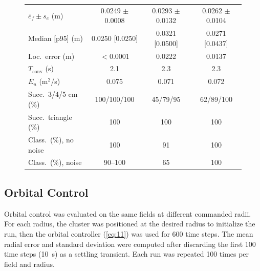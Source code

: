 \documentclass[lettersize,journal]{IEEEtran}
\makeatletter
\newcommand{\rev}[1]{#1}                             %
\providecommand{\DIFadd}[1]{{\protect\color{DIFaddtx}\uline{#1}}} %
\providecommand{\DIFdel}[1]{{\protect\color{DIFdeltx}\sout{#1}}} %
\providecommand{\DIFaddbegin}{\protect\color{DIFaddtx}} %
\providecommand{\DIFaddend}{\protect\color{black}} %
\providecommand{\DIFdelbegin}{\protect\color{DIFdeltx}} %
\providecommand{\DIFdelend}{\protect\color{black}} %
\providecommand{\DIFscaledelfig}{0.5} %
\newlength{\DIFdelgraphicswidth} %
\newlength{\DIFdelgraphicsheight} %
\providecommand{\DIFaddincludegraphics}[2][]{{\color{DIFaddtx}\setlength{\fboxrule}{1.5pt}\fbox{\DIFOincludegraphics[#1]{#2}}}} %
\providecommand{\DIFdelincludegraphics}[2][]{%
\sbox{\DIFdelgraphicsbox}{\DIFOincludegraphics[#1]{#2}}%
\settoboxwidth{\DIFdelgraphicswidth}{\DIFdelgraphicsbox} %
\settoboxtotalheight{\DIFdelgraphicsheight}{\DIFdelgraphicsbox} %
\scalebox{\DIFscaledelfig}{%
\parbox[b]{\DIFdelgraphicswidth}{\usebox{\DIFdelgraphicsbox}\\[-\baselineskip] \rule{\DIFdelgraphicswidth}{0em}}\llap{\resizebox{\DIFdelgraphicswidth}{\DIFdelgraphicsheight}{%
\setlength{\unitlength}{\DIFdelgraphicswidth}%
\begin{picture}(1,1)%
\thicklines\linethickness{2pt} %
{\color{DIFdeltx}\put(0,0){\framebox(1,1){}}}%
{\color{DIFdeltx}\put(0,0){\line( 1,1){1}}}%
{\color{DIFdeltx}\put(0,1){\line(1,-1){1}}}%
\end{picture}%
}\hspace*{3pt}}} %
} %
\DeclareRobustCommand{\DIFaddbegin}{\DIFOaddbegin \let\includegraphics\DIFaddincludegraphics} %
\DeclareRobustCommand{\DIFaddend}{\DIFOaddend \let\includegraphics\DIFOincludegraphics} %
\DeclareRobustCommand{\DIFdelbegin}{\DIFOdelbegin \let\includegraphics\DIFdelincludegraphics} %
\DeclareRobustCommand{\DIFdelend}{\DIFOdelend \let\includegraphics\DIFOincludegraphics} %
\let\sout@orig\sout %
\renewcommand{\sout}[1]{\ifmmode\text{\sout@orig{\ensuremath{#1}}}\else\sout@orig{#1}\fi} %
\makeatother
\begin{document}
\begin{figure}[!t]
{{\begin{tabular}{lccc}
$\bar{e}_f \pm s_e$ (m) & 0.0249 $\pm$ 0.0008 & 0.0293 $\pm$ 0.0132 & 0.0262 $\pm$ 0.0104 \\
Median [p95] (m) & 0.0250 [0.0250] & 0.0321 [0.0500] & 0.0271 [0.0437] \\
Loc.\ error (m) & $<$0.0001 & 0.0222 & 0.0137 \\
$T_{\mathrm{conv}}$ (s) & 2.1 & 2.3 & 2.3 \\
$E_u$ (m$^2$/s) & 0.075 & 0.071 & 0.072 \\
Succ.\ 3/4/5 cm (\%) & 100/100/100 & 45/79/95 & 62/89/100 \\
Succ.\ triangle (\%) & 100 & 100 & 100 \\
Class.\ (\%), no noise & 100 & 91 & 100 \\
Class.\ (\%), noise & 90--100 & 65 & 100 \\
\hline
\end{tabular}} %
}%
\DIFdelend %
    \DIFaddbegin \label{fig:nonlinear}
\end{figure}
\DIFaddend 

\subsection{Orbital Control}

Orbital control was evaluated on the same \DIFdelbegin \DIFdel{eight }\DIFdelend \DIFaddbegin \DIFadd{ten }\DIFaddend fields at different commanded radii. For each radius, the cluster was positioned at the desired radius to initialize the run, then the orbital controller (\ref{eq:11}) was used for 600 time steps. The mean radial error and standard deviation were computed after discarding the first 100 time steps (10~s) as a settling transient. Each run was repeated \rev{100} times per field and radius. %
\end{document}
